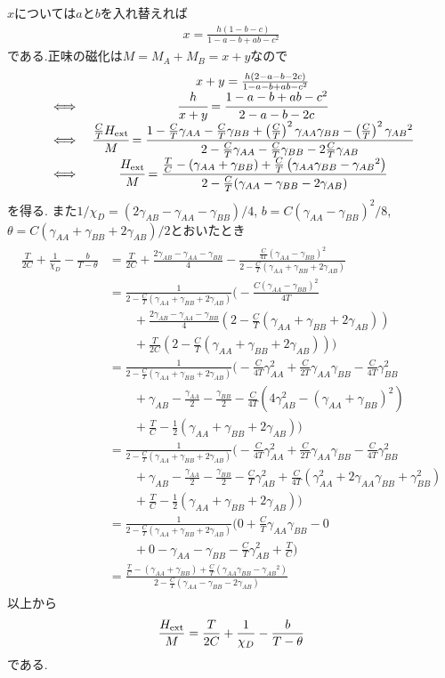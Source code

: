 \documentclass[uplatex,a4j,11pt,dvipdfmx]{jsarticle}
\newcommand{\gaa}{\gamma_{AA}}
\newcommand{\gbb}{\gamma_{BB}}
\newcommand{\gab}{\gamma_{AB}}
\begin{document}
$x$については$a$と$b$を入れ替えれば
\begin{align}
  x=\frac{h(1-b-c)}{1-a-b+ab-c^2}
\end{align}
である.正味の磁化は$M=M_A+M_B=x+y$なので
\begin{align}
  \begin{array}{cc}
    &x+y=\frac{h(2-a-b-2c)}{1-a-b+ab-c^2}\\
    \iff&\cfrac{h}{x+y}=\cfrac{1-a-b+ab-c^2}{2-a-b-2c}\\
    \iff&\cfrac{\frac{C}{T}H_{\rm ext}}{M}=\cfrac{1-\frac{C}{T}{\gaa}-\frac{C}{T}{\gbb}+\left(\frac{C}{T}\right)^2{\gaa}{\gbb}-\left(\frac{C}{T}\right)^2{\gab}^2}{2-\frac{C}{T}{\gaa}-\frac{C}{T}{\gbb}-2\frac{C}{T}{\gab}}\\
    \iff&\cfrac{H_{\rm ext}}{M}=\cfrac{\frac{T}{C}-({\gaa}+{\gbb})+\frac{C}{T}\left({\gaa}{\gbb}-{\gab}^2\right)}{2-\frac{C}{T}({\gaa}-{\gbb}-2{\gab})}
  \end{array}
\end{align}
を得る.
また$1/\chi_D=(2{\gab}-{\gaa}-{\gbb})/4$, $b=C({\gaa}-{\gbb})^2/8$, $\theta=C({\gaa}+{\gbb}+2{\gab})/2$とおいたとき
\begin{align}
  \begin{split}
    \frac{T}{2C}+\frac{1}{\chi_D}-\frac{b}{T-\theta}&=\frac{T}{2C}+\frac{2{\gab}-{\gaa}-{\gbb}}{4}-\frac{\frac{C}{4T}({\gaa}-{\gbb})^2}{2-\frac{C}{T}({\gaa}+{\gbb}+2{\gab})}\\
    &=\frac{1}{2-\frac{C}{T}(\gaa+{\gbb}+2{\gab})}\biggl(-\frac{C(\gaa-\gbb)^2}{4T}\\
      &\qquad+\frac{2\gab-\gaa-\gbb}{4}\left(2-\frac{C}{T}(\gaa+\gbb+2\gab)\right)\\
      &\qquad+\frac{T}{2C}\left(2-\frac{C}{T}(\gaa+\gbb+2\gab)\right)\biggr)\\
    &=\frac{1}{2-\frac{C}{T}(\gaa+{\gbb}+2{\gab})}
      \biggl(-\frac{C}{4T}\gaa^2+\frac{C}{2T}\gaa\gbb-\frac{C}{4T}\gbb^2\\
      &\qquad+\gab-\frac{\gaa}{2}-\frac{\gbb}{2}-\frac{C}{4T}\left(4\gab^2-(\gaa+\gbb)^2\right)\\
      &\qquad+\frac{T}{C}-\frac{1}{2}\left(\gaa+\gbb+2\gab\right)\biggr)\\
    &=\frac{1}{2-\frac{C}{T}(\gaa+{\gbb}+2{\gab})}
      \biggl(-\frac{C}{4T}\gaa^2+\frac{C}{2T}\gaa\gbb-\frac{C}{4T}\gbb^2\\
      &\qquad+\gab-\frac{\gaa}{2}-\frac{\gbb}{2}-\frac{C}{T}\gab^2+\frac{C}{4T}\left(\gaa^2+2\gaa\gbb+\gbb^2\right)\\
      &\qquad+\frac{T}{C}-\frac{1}{2}\left(\gaa+\gbb+2\gab\right)\biggr)\\
    &=\frac{1}{2-\frac{C}{T}(\gaa+{\gbb}+2{\gab})}
      \biggl(0+\frac{C}{T}\gaa\gbb-0\\
      &\qquad+0-\gaa-\gbb-\frac{C}{T}\gab^2+\frac{T}{C}\biggr)\\
    &=\frac{\frac{T}{C}-({\gaa}+{\gbb})+\frac{C}{T}\left({\gaa}{\gbb}-{\gab}^2\right)}{2-\frac{C}{T}({\gaa}-{\gbb}-2{\gab})}
  \end{split}
\end{align}
以上から
\begin{align}
  \frac{H_{\rm ext}}{M}=\frac{T}{2C}+\frac{1}{\chi_D}-\frac{b}{T-\theta}
\end{align}
である.
\end{document}
